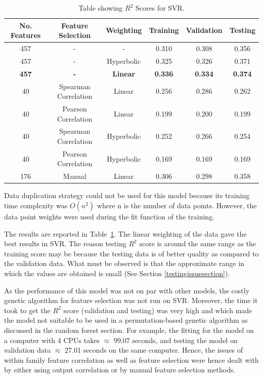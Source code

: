 \documentclass[11pt]{article}
\begin{document}
\begin{table} [h!]
\centering
\resizebox{\linewidth}{!} {
 \begin{tabular}{ | c | c | c | c | c | c | }
\hline
\textbf{No. Features} & \textbf{Feature Selection} & \textbf{Weighting} & \textbf{Training} & \textbf{Validation} &  \textbf{Testing} \\ [0.5 ex]
\hline \hline
457 & - & - & 0.310 & 0.308 & 0.356\\
457 & - & Hyperbolic & 0.325 & 0.326 & 0.371\\
\textbf{457} & \textbf{-} & \textbf{Linear}  & \textbf{0.336} &\textbf{0.334} & \textbf{0.374}\\
40 & Spearman Correlation & Linear & 0.256 & 0.286  & 0.262 \\ 
40 & Pearson Correlation & Linear & 0.199 & 0.200 & 0.199 \\ 
40 & Spearman Correlation & Hyperbolic & 0.252 & 0.266 & 0.254 \\ 
40 & Pearson Correlation & Hyperbolic & 0.169 & 0.169 & 0.169 \\ 
176 & Manual & Linear &  0.306  & 0.298  & 0.358\\ [1ex]
\hline
\end{tabular}
}
\caption{Table showing  $R^2$ Scores for SVR.}
\label {table:2}
\end{table}

Data duplication strategy could not be used for this model because its training time complexity was $O(n^2)$ where n is the number of data points. However, the data point weights were used during the fit function of the training.

The results are reported in Table~\ref{table:2}.
The linear weighting of the data gave the best results in SVR.
The reason testing $R^2$ score is around the same range as the training score may be because the testing data is of better quality as compared to the validation data.
What must be observed is that the approximate range in which the values are obtained is small (See Section \ref{testingissuesection}).

As the performance of this model was not on par with other models,
the costly genetic algorithm for feature selection was not run on SVR.
Moreover,  the time it took to get the $R^2$ score (validation and testing) was very high and which made the model not suitable to be used in a permutation-based genetic algorithm as discussed in the random forest section.
For example, the fitting for the model on a computer with 4 CPUs takes $\approx$ 99.07 seconds, and testing the model on validation data $\approx$ 27.01 seconds on the same computer. 
Hence,  the issues of within family feature correlation as well as feature selection were hence dealt with by either using output correlation or by manual feature selection methods.
\end{document}
